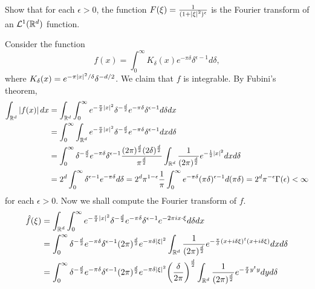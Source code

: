 \begin{exercise}
    Show that for each $\epsilon>0$, the function $F(\xi) = \frac{1}{(1+\left\lvert {\xi} \right\rvert^2)^\epsilon}$ is 
    the Fourier transform of an $\mathcal{L}^1(\mathbb{R}^d)$ function.
\end{exercise}
\begin{pf}
    Consider the function 
    \begin{equation*}
        f(x) = \int_0^{\infty} K_\delta(x)e^{-\pi\delta}\delta^{\epsilon-1}d\delta,
    \end{equation*}
    where $K_\delta(x) = e^{-\pi\left\lvert {x} \right\rvert^2/\delta}\delta^{-d/2}$. We claim that 
    $f$ is integrable. By Fubini's theorem, 
    \begin{equation*}
        \begin{split}
            \int_{\mathbb{R}^d} \left\lvert {f(x)} \right\rvert dx &= \int_{\mathbb{R}^d} \int_0^{\infty} e^{-\frac{\pi}{\delta}\left\lvert {x} \right\rvert^2}\delta^{-\frac{d}{2}}e^{-\pi\delta}\delta^{\epsilon-1}d\delta dx \\ 
            &= \int_0^\infty \int_{\mathbb{R}^d} e^{-\frac{\pi}{\delta}\left\lvert {x} \right\rvert^2}\delta^{-\frac{d}{2}}e^{-\pi\delta}\delta^{\epsilon-1}dx d\delta \\ 
            &= \int_0^\infty \delta^{-\frac{d}{2}}e^{-\pi\delta}\delta^{\epsilon-1}\frac{(2\pi)^{\frac{d}{2}}(2\delta)^{\frac{d}{2}}}{\pi^{\frac{d}{2}}}\int_{\mathbb{R}^d}\frac{1}{(2\pi)^{\frac{d}{2}}} e^{-\frac{1}{2}\left\lvert {x} \right\rvert^2} dxd\delta \\
            &= 2^d\int_0^\infty \delta^{\epsilon-1}e^{-\pi\delta}d\delta 
            = 2^d\pi^{1-\epsilon}\frac{1}{\pi}\int_0^\infty e^{-\pi\delta}(\pi\delta)^{\epsilon-1}d(\pi\delta) = 2^d\pi^{-\epsilon}\Gamma(\epsilon) < \infty
        \end{split}
    \end{equation*}
    for each $\epsilon>0$. Now we shall compute the Fourier transform of $f$. 
    \begin{equation*}
        \begin{split}
            \hat{f}(\xi) &= \int_{\R^d}\int_0^\infty e^{-\frac{\pi}{\delta}\abs{x}^2}\delta^{-\frac{d}{2}}e^{-\pi\delta}\delta^{\epsilon-1}e^{-2\pi i x\cdot\xi}d\delta dx \\ 
            &= \int_0^\infty \delta^{-\frac{d}{2}}e^{-\pi\delta}\delta^{\epsilon-1}(2\pi)^{\frac{d}{2}}e^{-\pi\delta\abs{\xi}^2} \int_{\R^d} \frac{1}{(2\pi)^{\frac{d}{2}}} e^{-\frac{\pi}{\delta}(x+i\delta\xi)^t(x+i\delta\xi)}dx d\delta \\ 
            &= \int_0^\infty \delta^{-\frac{d}{2}}e^{-\pi\delta}\delta^{\epsilon-1}(2\pi)^{\frac{d}{2}}e^{-\pi\delta\abs{\xi}^2}\pth{\frac{\delta}{2\pi}}^{\frac{d}{2}} \int_{\R^d} \frac{1}{(2\pi)^{\frac{d}{2}}} e^{-\frac{\pi}{\delta}y^ty}dy d\delta \\ 

\end{split}
\end{equation*}
\end{pf}
